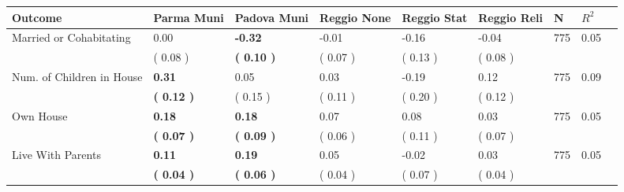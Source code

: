 \begin{tabular}{L{6.2cm} C{1.8cm} C{1.8cm} C{1.8cm} C{1.8cm} C{1.8cm} C{1.8cm} C{0.3cm} C{0.3cm}}
\toprule
 \textbf{Outcome} & \textbf{Parma Muni} & \textbf{Padova Muni} & \textbf{Reggio None} & \textbf{Reggio Stat} & \textbf{Reggio Reli} & \textbf{N} & \textbf{$ R^2$} \\
\midrule
Married or Cohabitating &      0.00 & \textbf{    -0.32} &     -0.01 &     -0.16 &     -0.04  & 775 &       0.05 \\ 
 & (     0.08 ) & \textbf{(     0.10 )} & (     0.07 ) & (     0.13 ) & (     0.08 )  & \\
Num. of Children in House & \textbf{     0.31} &      0.05 &      0.03 &     -0.19 &      0.12  & 775 &       0.09 \\ 
 & \textbf{(     0.12 )} & (     0.15 ) & (     0.11 ) & (     0.20 ) & (     0.12 )  & \\
Own House & \textbf{     0.18} & \textbf{     0.18} &      0.07 &      0.08 &      0.03  & 775 &       0.05 \\ 
 & \textbf{(     0.07 )} & \textbf{(     0.09 )} & (     0.06 ) & (     0.11 ) & (     0.07 )  & \\
Live With Parents & \textbf{     0.11} & \textbf{     0.19} &      0.05 &     -0.02 &      0.03  & 775 &       0.05 \\ 
 & \textbf{(     0.04 )} & \textbf{(     0.06 )} & (     0.04 ) & (     0.07 ) & (     0.04 )  & \\
\bottomrule
\end{tabular}
